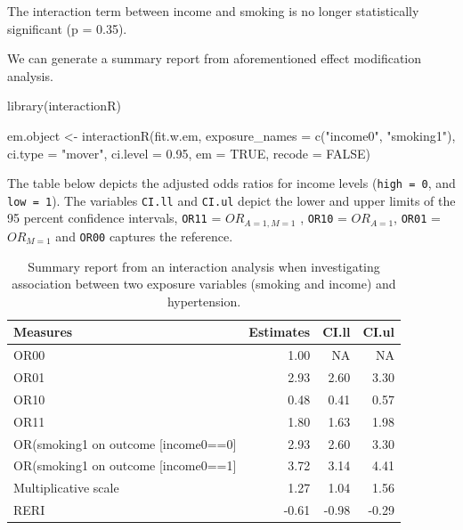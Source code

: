 \documentclass[
  letterpaper,
  DIV=11,
  numbers=noendperiod]{scrreprt}
\newenvironment{Shaded}{\begin{snugshade}}{\end{snugshade}}
\newcommand{\AttributeTok}[1]{\textcolor[rgb]{0.40,0.45,0.13}{#1}}
\newcommand{\ConstantTok}[1]{\textcolor[rgb]{0.56,0.35,0.01}{#1}}
\newcommand{\FloatTok}[1]{\textcolor[rgb]{0.68,0.00,0.00}{#1}}
\newcommand{\FunctionTok}[1]{\textcolor[rgb]{0.28,0.35,0.67}{#1}}
\newcommand{\NormalTok}[1]{\textcolor[rgb]{0.00,0.23,0.31}{#1}}
\newcommand{\OtherTok}[1]{\textcolor[rgb]{0.00,0.23,0.31}{#1}}
\newcommand{\StringTok}[1]{\textcolor[rgb]{0.13,0.47,0.30}{#1}}
\begin{document}
The interaction term between income and smoking is no longer
statistically significant (p = 0.35).

We can generate a summary report from aforementioned effect modification
analysis.

\begin{Shaded}
\begin{Highlighting}[]
\FunctionTok{library}\NormalTok{(interactionR)}

\NormalTok{em.object }\OtherTok{\textless{}{-}} \FunctionTok{interactionR}\NormalTok{(fit.w.em, }
                          \AttributeTok{exposure\_names =} \FunctionTok{c}\NormalTok{(}\StringTok{"income0"}\NormalTok{, }\StringTok{"smoking1"}\NormalTok{), }
                          \AttributeTok{ci.type =} \StringTok{"mover"}\NormalTok{, }\AttributeTok{ci.level =} \FloatTok{0.95}\NormalTok{, }
                          \AttributeTok{em =} \ConstantTok{TRUE}\NormalTok{, }\AttributeTok{recode =} \ConstantTok{FALSE}\NormalTok{)}
\end{Highlighting}
\end{Shaded}

The table below depicts the adjusted odds ratios for income levels
(\texttt{high\ =\ 0}, and \texttt{low\ =\ 1}). The variables
\texttt{CI.ll} and \texttt{CI.ul} depict the lower and upper limits of
the 95 percent confidence intervals, \texttt{OR11} =
\(OR_{A = 1, M = 1}\) , \texttt{OR10} = \(OR_{A = 1}\), \texttt{OR01} =
\(OR_{M = 1}\) and \texttt{OR00} captures the reference.

\hypertarget{tbl-effint-fit.w.em}{}
\begin{table}[!h]
\caption{\label{tbl-effint-fit.w.em}Summary report from an interaction analysis when investigating
association between two exposure variables (smoking and income) and
hypertension. }\tabularnewline

\centering
\begin{tabular}{lrrr}
\toprule
Measures & Estimates & CI.ll & CI.ul\\
\midrule
OR00 & 1.00 & NA & NA\\
OR01 & 2.93 & 2.60 & 3.30\\
OR10 & 0.48 & 0.41 & 0.57\\
OR11 & 1.80 & 1.63 & 1.98\\
OR(smoking1 on outcome [income0==0] & 2.93 & 2.60 & 3.30\\
\addlinespace
OR(smoking1 on outcome [income0==1] & 3.72 & 3.14 & 4.41\\
Multiplicative scale & 1.27 & 1.04 & 1.56\\
RERI & -0.61 & -0.98 & -0.29\\
\bottomrule
\end{tabular}
\end{table}
\end{document}
